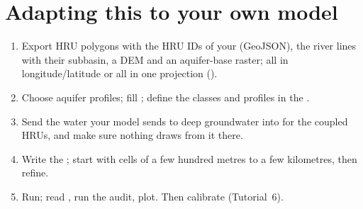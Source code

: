 \section{Adapting this to your own model}
\begin{enumerate}
\item Export HRU polygons with the HRU IDs of your  (GeoJSON), the river lines with their subbasin, a DEM and an
      aquifer-base raster; all in longitude/latitude or all in one projection ().
\item Choose aquifer profiles; fill ; define the classes and profiles in the .
\item Send the water your model sends to deep groundwater into  for the coupled HRUs, and make sure nothing
      draws from it there.
\item Write the ; start with cells of a few hundred metres to a few kilometres, then refine.
\item Run; read , run the audit, plot. Then calibrate (Tutorial~6).
\end{enumerate}
